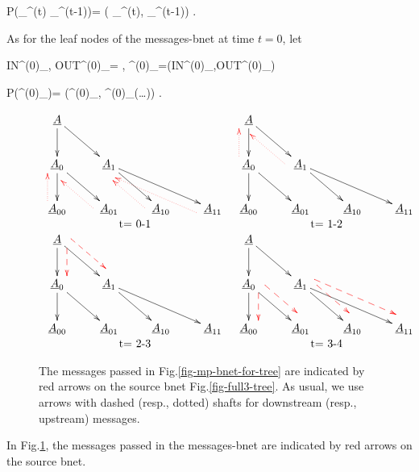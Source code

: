 \beq\color{blue}
P(\calm_{\rvx}^{(t)}\cond
\calm_{\rvx}^{(t-1)})=
\delta(
\calm_{\rvx}^{(t)},
\calm_{\rvx}^{(t-1)})
\;.
\eeq

As for the leaf nodes
of the messages-bnet  at time $t=0$,
let


\beq
IN^{(0)}_,\;\;
OUT^{(0)}_\rvA= ,\;\;
\calm^{(0)}_\rvA=(IN^{(0)}_\rvA,OUT^{(0)}_\rvA)
\eeq

\beq\color{blue}
P(\calm^{(0)}_\rvA)=
\delta(\calm^{(0)}_\rvA,
\calm^{(0)}_\rvA(\ldots))
\;.
\eeq


\begin{figure}[h!]
\centering
$$
\begin{array}{cc}
\xymatrix{
\rvA\ar[d]\ar[dr]
\\
\rvA_{0}\ar[d]\ar[dr]
&\rvA_{1}\ar[dr]\ar[drr]
\\
\rvA_{00}\ar@[red]@{.>}@<2ex>[u]
&\rvA_{01}\ar@[red]@{.>}@<2ex>[ul]
&\rvA_{10}\ar@[red]@{.>}@<2ex>[ul]
&\rvA_{11}\ar@[red]@{.>}@<2ex>[ull]
}
&
\xymatrix{
\rvA\ar[d]\ar[dr]
\\
\rvA_{0}\ar[d]\ar[dr]
\ar@[red]@{.>}@<2ex>[u]
&\rvA_{1}\ar[dr]\ar[drr]
\ar@[red]@{.>}@<2ex>[ul]
\\
\rvA_{00}
&\rvA_{01}
&\rvA_{10}
&\rvA_{11}
}
\\
\text{t= 0-1}&\text{t= 1-2}
\\
\xymatrix{
\rvA\ar[d]\ar[dr]
\ar@[red]@{-->}@<2ex>[d]
\ar@[red]@{-->}@<2ex>[dr]
\\
\rvA_{0}\ar[d]\ar[dr]
&\rvA_{1}\ar[dr]\ar[drr]
\\
\rvA_{00}
&\rvA_{01}
&\rvA_{10}
&\rvA_{11}
}
&
\xymatrix{
\rvA\ar[d]\ar[dr]
\\
\rvA_{0}\ar[d]\ar[dr]
\ar@[red]@{-->}@<2ex>[d]
\ar@[red]@{-->}@<2ex>[dr]
&\rvA_{1}\ar[dr]\ar[drr]
\ar@[red]@{-->}@<2ex>[dr]
\ar@[red]@{-->}@<2ex>[drr]
\\
\rvA_{00}
&\rvA_{01}
&\rvA_{10}
&\rvA_{11}
}
\\
\text{t= 2-3}&\text{t= 3-4}
\end{array}
$$
\caption{
The messages passed in 
Fig.\ref{fig-mp-bnet-for-tree}
are indicated by red arrows
on the source bnet 
Fig.\ref{fig-full3-tree}.
As usual, we use arrows with
dashed (resp., dotted) shafts for
downstream (resp., upstream) messages. 
}
\label{fig-full3-tree-messages}
\end{figure}


In Fig.\ref{fig-full3-tree-messages},
the messages passed in the messages-bnet
are indicated by red arrows
on the source bnet.

